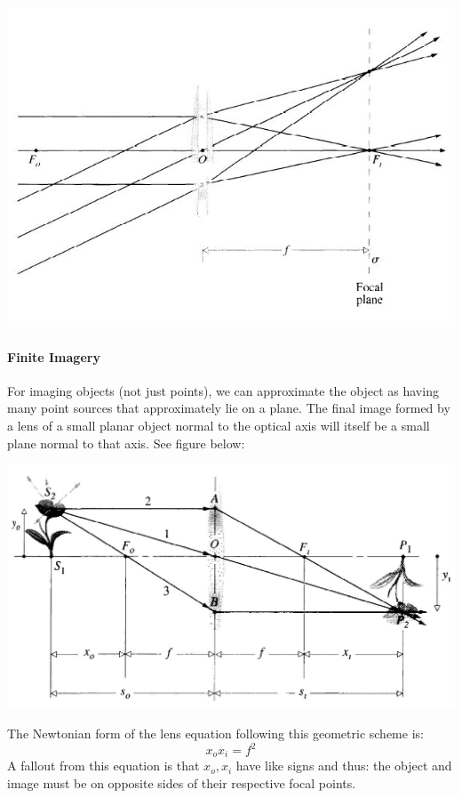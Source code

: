 \documentclass[12pt]{report}
\begin{document}
\includegraphics[scale=.75]{FocalPlane1.jpg}

\paragraph{Finite Imagery}

For imaging objects (not just points), we can approximate the object as having many point sources that approximately lie on a plane. The final image formed by a lens of a small planar object normal to the optical axis will itself be a small plane normal to that axis. See figure below:

\includegraphics[scale=.4]{FiniteImagery.jpg}

The Newtonian form of the lens equation following this geometric scheme is: 
\begin{equation}
x_ox_i = f^2
\end{equation}
A fallout from this equation is that $x_o, x_i$ have like signs and thus: the object and image must be on opposite sides of their respective focal points. 
\end{document}
